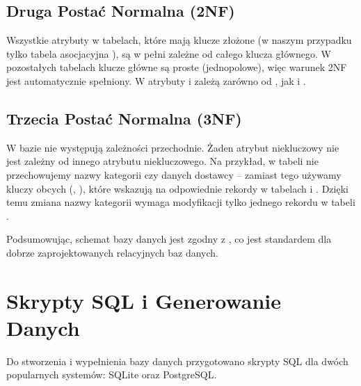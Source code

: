 \documentclass[a4paper,11pt,polish]{sphinxmanual}
\begin{document}
\subsection{Druga Postać Normalna (2NF)}
\label{\detokenize{rozdzial_4:druga-postac-normalna-2nf}}
\sphinxAtStartPar
Wszystkie atrybuty w tabelach, które mają klucze złożone (w naszym przypadku tylko tabela asocjacyjna ), są w pełni zależne od całego klucza głównego. W pozostałych tabelach klucze główne są proste (jednopolowe), więc warunek 2NF jest automatycznie spełniony. W  atrybuty  i  zależą zarówno od , jak i .


\subsection{Trzecia Postać Normalna (3NF)}
\label{\detokenize{rozdzial_4:trzecia-postac-normalna-3nf}}
\sphinxAtStartPar
W bazie nie występują zależności przechodnie. Żaden atrybut niekluczowy nie jest zależny od innego atrybutu niekluczowego. Na przykład, w tabeli  nie przechowujemy nazwy kategorii czy danych dostawcy – zamiast tego używamy kluczy obcych (, ), które wskazują na odpowiednie rekordy w tabelach  i . Dzięki temu zmiana nazwy kategorii wymaga modyfikacji tylko jednego rekordu w tabeli .

\sphinxAtStartPar
Podsumowując, schemat bazy danych jest zgodny z , co jest standardem dla dobrze zaprojektowanych relacyjnych baz danych.


\section{Skrypty SQL i Generowanie Danych}
\label{\detokenize{rozdzial_4:skrypty-sql-i-generowanie-danych}}
\sphinxAtStartPar
Do stworzenia i wypełnienia bazy danych przygotowano skrypty SQL dla dwóch popularnych systemów: SQLite oraz PostgreSQL.
\end{document}
